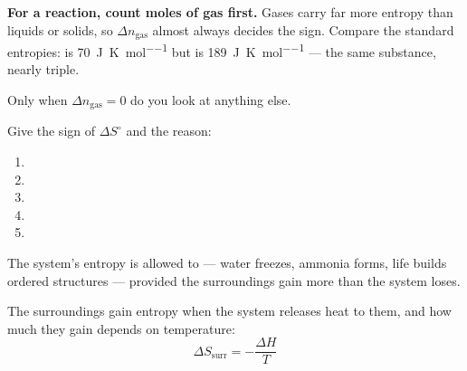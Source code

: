 \documentclass{apchem-notes}
\begin{document}
\begin{apctrap}
\textbf{For a reaction, count moles of gas first.} Gases carry far more
entropy than liquids or solids, so $\Delta n_{\text{gas}}$ almost always
decides the sign. Compare the standard entropies:
 is \SI{70}{\joule\per\kelvin\per\mole} but  is
\SI{189}{\joule\per\kelvin\per\mole} --- the same substance, nearly triple.

Only when $\Delta n_{\text{gas}} = 0$ do you look at anything else.
\end{apctrap}


Give the sign of $\Delta S^\circ$ and the reason:

\begin{enumerate}[leftmargin=*,itemsep=0.35em]
  \item {}
  \item {}
  \item {}
  \item {}
  \item {}
\end{enumerate}



\begin{center}
\end{center}

The system's entropy is allowed to  --- water
freezes, ammonia forms, life builds ordered structures --- provided the
surroundings gain more than the system loses.

The surroundings gain entropy when the system releases heat to them, and how
much they gain depends on temperature:
\[ \Delta S_{\text{surr}} = -\frac{\Delta H}{T} \]
\end{document}
